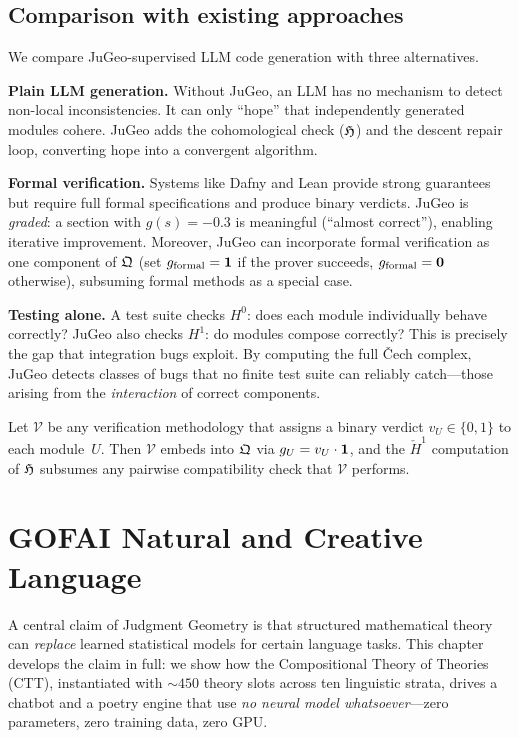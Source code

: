 \section{Comparison with existing approaches}
\label{sec:llm-comparison}

We compare JuGeo-supervised LLM code generation with three
alternatives.

\medskip\noindent
\textbf{Plain LLM generation.}\;
Without JuGeo, an LLM has no mechanism to detect non-local
inconsistencies.  It can only ``hope'' that independently generated
modules cohere.  JuGeo adds the cohomological check ($\mathfrak{H}$)
and the descent repair loop, converting hope into a convergent
algorithm.

\medskip\noindent
\textbf{Formal verification.}\;
Systems like Dafny and Lean provide strong guarantees but require
full formal specifications and produce binary verdicts.
JuGeo is \emph{graded}: a section with
$g(s) = -0.3$ is meaningful (``almost correct''),
enabling iterative improvement.  Moreover, JuGeo can incorporate
formal verification as one component of $\mathfrak{Q}$ (set
$g_{\mathrm{formal}} = \mathbf{1}$ if the prover succeeds,
$g_{\mathrm{formal}} = \mathbf{0}$ otherwise), subsuming
formal methods as a special case.

\medskip\noindent
\textbf{Testing alone.}\;
A test suite checks $H^0$: does each module individually behave
correctly?  JuGeo also checks $H^1$: do modules compose correctly?
This is precisely the gap that integration bugs exploit.
By computing the full \v{C}ech complex, JuGeo detects classes
of bugs that no finite test suite can reliably catch---those
arising from the \emph{interaction} of correct components.

\begin{proposition}[Subsumption]
\label{prop:subsumption}
Let $\mathcal{V}$ be any verification methodology that assigns a
binary verdict $v_U \in \{0,1\}$ to each module~$U$.  Then
$\mathcal{V}$ embeds into $\mathfrak{Q}$ via $g_U = v_U \cdot \mathbf{1}$,
and the $\check{H}^1$ computation of $\mathfrak{H}$ subsumes any pairwise
compatibility check that $\mathcal{V}$ performs.
\end{proposition}

\chapter{GOFAI Natural and Creative Language}
\label{ch:gofai-nl}

A central claim of Judgment Geometry is that structured mathematical
theory can \emph{replace} learned statistical models for certain
language tasks.  This chapter develops the claim in full: we show how
the Compositional Theory of Theories (CTT), instantiated with $\sim\!450$
theory slots across ten linguistic strata, drives a chatbot and a
poetry engine that use \emph{no neural model whatsoever}---zero
parameters, zero training data, zero GPU.

